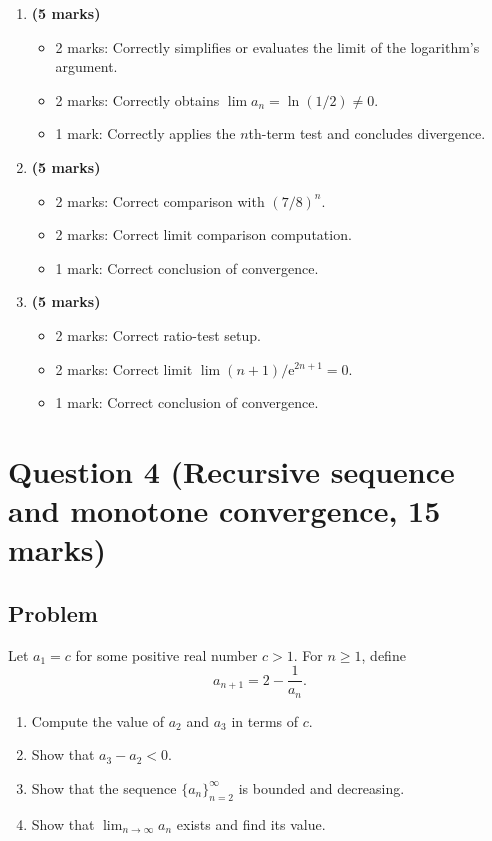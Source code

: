 \documentclass[12pt]{article}
\newcommand{\ee}{\mathrm{e}}
\begin{document}
\begin{enumerate}[label=(\alph*)]
\item \textbf{(5 marks)}
\begin{itemize}
\item 2 marks: Correctly simplifies or evaluates the limit of the logarithm's argument.
\item 2 marks: Correctly obtains $\lim a_n=\ln(1/2)\ne0$.
\item 1 mark: Correctly applies the $n$th-term test and concludes divergence.
\end{itemize}

\item \textbf{(5 marks)}
\begin{itemize}
\item 2 marks: Correct comparison with $(7/8)^n$.
\item 2 marks: Correct limit comparison computation.
\item 1 mark: Correct conclusion of convergence.
\end{itemize}

\item \textbf{(5 marks)}
\begin{itemize}
\item 2 marks: Correct ratio-test setup.
\item 2 marks: Correct limit $\lim (n+1)/\ee^{2n+1}=0$.
\item 1 mark: Correct conclusion of convergence.
\end{itemize}
\end{enumerate}

\newpage
\section{Question 4 (Recursive sequence and monotone convergence, 15 marks)}

\subsection{Problem}

Let $a_1=c$ for some positive real number $c>1$. For $n\ge 1$, define
\[
a_{n+1}=2-\frac1{a_n}.
\]

\begin{enumerate}[label=(\roman*)]
\item Compute the value of $a_2$ and $a_3$ in terms of $c$.
\item Show that $a_3-a_2<0$.
\item Show that the sequence $\{a_n\}_{n=2}^{\infty}$ is bounded and decreasing.
\item Show that $\lim_{n\to\infty}a_n$ exists and find its value.
\end{enumerate}
\end{document}
